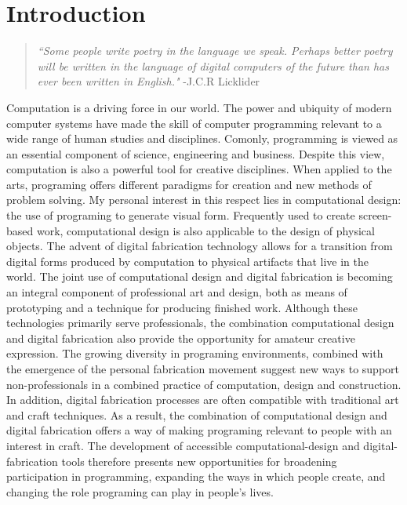 \chapter{Introduction}
\begin{quotation}

\textit{``Some people write poetry in the language we speak. Perhaps better poetry will be written in the language of digital computers of the future than has ever been written in English."}
-J.C.R Licklider
\end{quotation}


Computation is a driving force in our world. The power and ubiquity of  modern computer systems have made the skill of computer programming relevant to a wide range of human studies and disciplines. Comonly, programming is viewed as an essential component of science, engineering and business. Despite this view, computation is also a powerful tool for creative disciplines. When applied to the arts, programing offers different paradigms for creation and new methods of problem solving. My personal interest in this respect lies in computational design: the use of programing to generate visual form. Frequently used to create screen-based work, computational design is also applicable to the design of physical objects. The advent of digital fabrication technology allows for a transition from digital forms produced by computation to physical artifacts that live in the world. The joint use of computational design and digital fabrication is becoming an integral component  of professional art and design, both as means of prototyping and a technique for producing finished work. Although these technologies primarily serve professionals, the combination computational design and digital fabrication also provide the opportunity for amateur creative expression. The growing diversity in programing environments, combined with the emergence of the personal fabrication movement suggest new ways to support non-professionals in a combined practice of computation, design and construction. In addition, digital fabrication processes are often compatible with traditional art and craft techniques. As a result, the combination of computational design and digital fabrication offers a way of making programing relevant to people with an interest in craft.  The development of accessible computational-design and digital-fabrication tools therefore presents new opportunities for broadening participation in programming, expanding the ways in which people create, and changing the role programing can play in people's lives.

